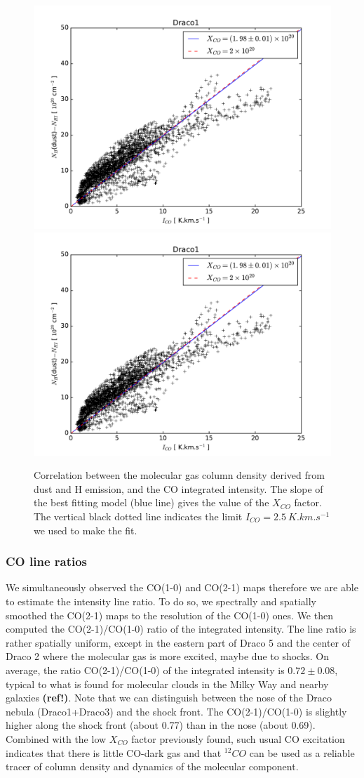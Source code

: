 \documentclass[traditabstract]{aa}
\begin{document}
\begin{figure}[h!]
  \includegraphics[page=10,width=0.48\linewidth,trim=30 10 50 25,clip=true]{Figures/dust-CO_comparison.pdf}
  \hspace{3mm}
  \includegraphics[page=12,width=0.48\linewidth,trim=30 10 50 25,clip=true]{Figures/dust-CO_comparison.pdf}
  \caption{\label{Xco} Correlation between the molecular gas column density derived from dust and H emission, and the CO integrated intensity. The slope of the best fitting model (blue line) gives the value of the $X_{CO}$ factor. The vertical black dotted line indicates the limit $I_{CO}=2.5\: K.km.s^{-1}$ we used to make the fit.}
\end{figure}


      \subsubsection{CO line ratios}

   We simultaneously observed the CO(1-0) and CO(2-1) maps therefore we are able to estimate the intensity line ratio. To do so, we spectrally and spatially smoothed the CO(2-1) maps to the resolution of the CO(1-0) ones. We then computed the CO(2-1)/CO(1-0) ratio of the integrated intensity. The line ratio is rather spatially uniform, except in the eastern part of Draco 5 and the center of Draco 2 where the molecular gas is more excited, maybe due to shocks.
On average, the ratio CO(2-1)/CO(1-0) of the integrated intensity is $0.72\pm 0.08$, typical to what is found for molecular clouds in the Milky Way and nearby galaxies \textbf{(ref!)}.
Note that we can distinguish between the nose of the Draco nebula (Draco1+Draco3) and the shock front. The CO(2-1)/CO(1-0) is slightly higher along the shock front (about 0.77) than in the nose (about 0.69).
Combined with the low $X_{CO}$ factor previously found, such usual CO excitation indicates that there is little CO-dark gas and that $^{12}CO$ can be used as a reliable tracer of column density and dynamics of the molecular component.
\end{document}
